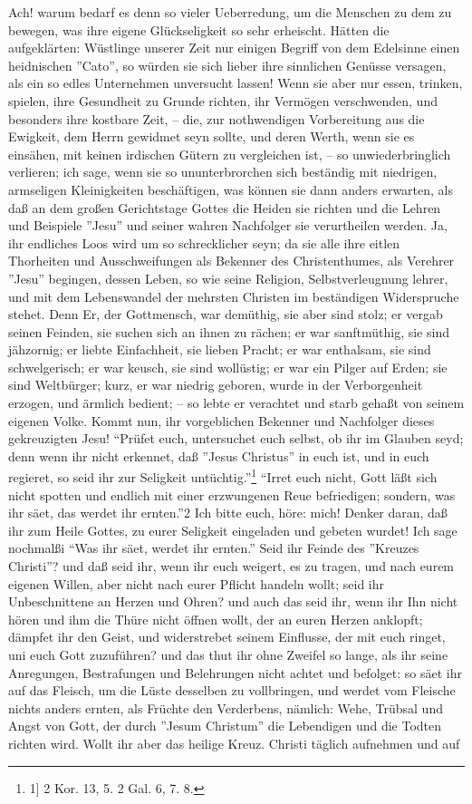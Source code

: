 Ach! warum bedarf es denn so vieler Ueberredung, um die Menschen zu dem zu bewegen, was ihre eigene Glückseligkeit so sehr erheischt. Hätten die aufgeklärten: Wüstlinge unserer Zeit nur einigen Begriff von dem Edelsinne einen heidnischen ''Cato'', so würden sie sich lieber ihre sinnlichen Genüsse versagen, als ein so edles Unternehmen unversucht lassen! Wenn sie aber nur essen, trinken, spielen, ihre Gesundheit zu Grunde richten, ihr Vermögen verschwenden, und besonders ihre kostbare Zeit, – die, zur nothwendigen Vorbereitung aus die Ewigkeit, dem Herrn gewidmet seyn sollte, und deren Werth, wenn sie es einsähen, mit keinen irdischen Gütern zu vergleichen ist, – so unwiederbringlich verlieren; ich sage, wenn sie so ununterbrorchen sich beständig mit niedrigen, armseligen Kleinigkeiten beschäftigen, was können sie dann anders erwarten, als daß an dem großen Gerichtstage Gottes die Heiden sie richten und die Lehren und Beispiele ''Jesu'' und seiner wahren Nachfolger sie verurtheilen werden. Ja, ihr endliches Loos wird um so schrecklicher seyn; da sie alle ihre eitlen Thorheiten und Ausschweifungen als Bekenner des Christenthumes, als Verehrer ''Jesu'' begingen, dessen Leben, so wie seine Religion, Selbstverleugnung lehrer, und mit dem Lebenswandel der mehrsten Christen im beständigen Widerspruche stehet. Denn Er, der Gottmensch, war demüthig, sie aber sind stolz; er vergab seinen Feinden, sie suchen sich an ihnen zu rächen; er war sanftmüthig, sie sind jähzornig; er liebte Einfachheit, sie lieben Pracht; er war enthalsam, sie sind schwelgerisch; er war keusch, sie sind wollüstig; er war ein Pilger auf Erden; sie sind Weltbürger; kurz, er war niedrig geboren, wurde in der Verborgenheit erzogen, und ärmlich  bedient; – so lebte er verachtet und starb gehaßt von seinem eigenen Volke. Kommt nun, ihr vorgeblichen Bekenner und Nachfolger dieses gekreuzigten Jesu! "`Prüfet euch, untersuchet euch selbst, ob ihr im Glauben seyd; denn wenn ihr nicht erkennet, daß ''Jesus Christus'' in euch ist, und in euch regieret, so seid ihr zur Seligkeit untüchtig."'\footnote{1] 2 Kor. 13, 5. 2 Gal. 6, 7. 8.}  "`Irret euch nicht, Gott läßt sich nicht spotten und endlich mit einer erzwungenen Reue befriedigen; sondern, was ihr säet, das werdet ihr ernten."'2 Ich bitte euch, höre: mich! Denker daran, daß ihr zum Heile Gottes, zu eurer Seligkeit eingeladen und gebeten wurdet! Ich sage nochmalßi "`Was ihr säet, werdet ihr ernten."' Seid ihr Feinde des ''Kreuzes Christi''? und daß seid ihr, wenn ihr euch weigert, es zu tragen, und nach eurem eigenen Willen, aber nicht nach eurer Pflicht handeln wollt; seid ihr Unbeschnittene an Herzen und Ohren? und auch das seid ihr, wenn ihr Ihn nicht hören und ihm die Thüre nicht öffnen wollt, der an euren Herzen anklopft; dämpfet ihr den Geist, und widerstrebet seinem Einflusse, der mit euch ringet, uni euch Gott zuzuführen? und das thut ihr ohne Zweifel so lange, als ihr seine Anregungen, Bestrafungen und Belehrungen nicht achtet und befolget: so säet ihr auf das Fleisch, um die Lüste desselben zu vollbringen, und werdet vom Fleische nichts anders ernten, als Früchte den Verderbens, nämlich: Wehe, Trübsal und Angst von Gott, der durch ''Jesum Christum'' die Lebendigen und die Todten richten wird. Wollt ihr aber das heilige Kreuz. Christi täglich aufnehmen und auf 